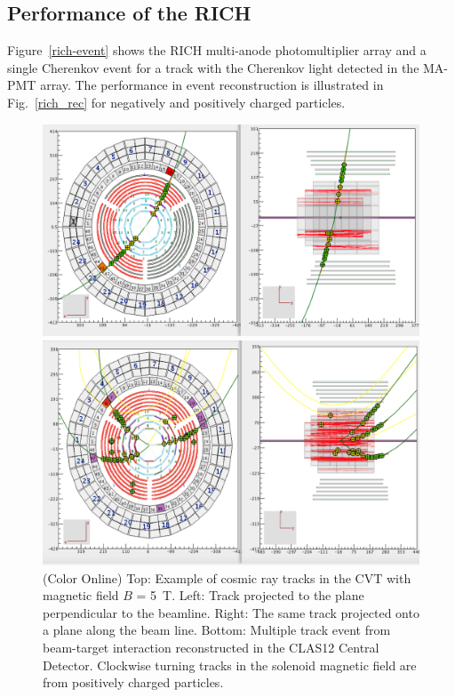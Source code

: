 \documentclass[final,3p,twocolumn]{elsarticle}
\begin{document}
\subsection{Performance of the RICH} 

Figure~\ref{rich-event} shows the RICH multi-anode photomultiplier array and a single Cherenkov event for a
track with the Cherenkov light detected in the MA-PMT array.  The performance in event reconstruction is
illustrated in Fig.~\ref{rich_rec} for negatively and positively charged particles. 



\begin{figure}[htbp!]
\centerline{\includegraphics[width=1.0\columnwidth]{cvt-cosmic-w-solenoid.png}}
\centerline{\includegraphics[width=1.0\columnwidth]{cvt-3-tracks.png}}
\caption{(Color Online) Top: Example of cosmic ray tracks in the CVT with magnetic field $B$ = 5~T. Left: Track projected to
the plane perpendicular to the beamline. Right: The same track projected onto a plane along the beam line. Bottom:
Multiple track event from beam-target interaction reconstructed in the CLAS12 Central Detector. 
Clockwise turning tracks in the solenoid magnetic field are from positively charged particles.}
\label{cvt-tracks}
\end{figure}
\end{document}
